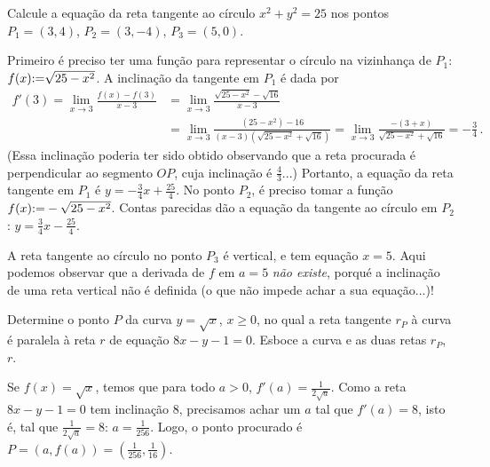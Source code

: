 \begin{exo}\label{Exo:tangenteaucercle}
Calcule a equação da reta tangente ao círculo $x^2+y^2=25$ nos pontos
$P_1=(3,4)$, $P_2=(3,-4)$, $P_3=(5,0)$.
\begin{sol}
Primeiro é preciso ter uma função para representar o círculo na vizinhança de
$P_1$: $f(x){:=} \sqrt{25-x^2}$. A inclinação da tangente em $P_1$ é dada por
\begin{align*}
f'(3)=\lim_{x\to 3}\frac{f(x)-f(3)}{x-3}&=
\lim_{x\to 3}\frac{\sqrt{25-x^2}-\sqrt{16}}{x-3}\\
&=\lim_{x\to 3}\frac{(25-x^2)-{16}}{(x-3)(\sqrt{25-x^2}+\sqrt{16})}
=\lim_{x\to 3}\frac{-(3+x)}{\sqrt{25-x^2}+\sqrt{16}}=-\tfrac34\,.
\end{align*}
(Essa inclinação poderia ter sido obtido observando que a reta
procurada é perpendicular ao segmento $OP$, cuja inclinação é
$\frac43$...)
Portanto, a equação da reta tangente em $P_1$ é $y=-\frac34
x+\frac{25}{4}$.  No ponto $P_2$, é preciso tomar a função 
$f(x){:=} -\sqrt{25-x^2}$. Contas parecidas dão a equação
da tangente ao círculo em $P_2$: $y=\frac34 x-\frac{25}{4}$.
\begin{center}
\begin{bmlimage}\end{bmlimage}
\end{center}
A reta tangente ao círculo no ponto $P_3$ é vertical, e tem equação $x=5$.
Aqui podemos observar que a derivada de $f$ em $a=5$ \emph{não existe}, porqué
a inclinação de uma reta vertical não é definida (o que não impede achar a sua
equação...)!
\end{sol}
\end{exo}

\begin{exo}
Determine o ponto $P$ da curva $y = \sqrt{x}$, $x\geq 0$, no qual a reta
tangente
$r_P$ \`a curva \'e paralela \`a 
reta $r$ de equa\c c\~ao 
$8x-y- 1 = 0$. Esboce a curva e as duas retas $r_P$, $r$.
\begin{sol}
Se $f(x)=\sqrt{x}$, temos que para todo $a>0$,
$f'(a)=\frac{1}{2\sqrt{a}}$.
Como a reta $8x-y- 1 = 0$ tem inclinação $8$, precisamos achar um $a$ tal que
$f'(a)=8$, isto é, tal que $\frac{1}{2\sqrt{a}}=8$: $a=\frac{1}{256}$.
Logo, o ponto procurado é $P=(a,f(a))=(\frac{1}{256},\frac{1}{16})$.
\end{sol}
\end{exo}


